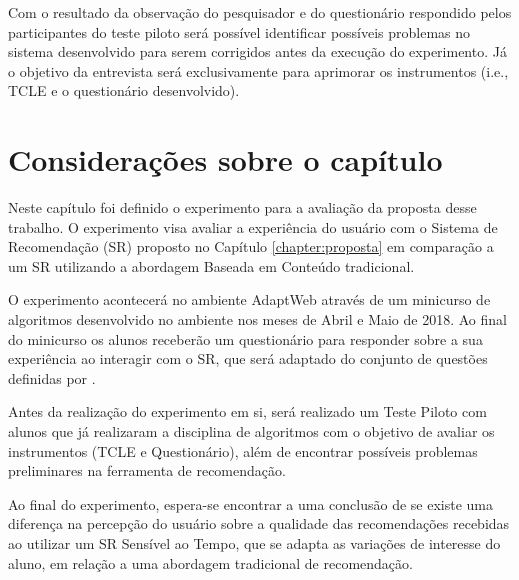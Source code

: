 Com o resultado da observação do pesquisador e do questionário respondido pelos participantes do teste piloto será possível
identificar possíveis problemas no sistema desenvolvido para serem corrigidos antes da execução do experimento. Já o objetivo da
entrevista será exclusivamente para aprimorar os instrumentos (i.e., TCLE e o questionário desenvolvido).

\section{Considerações sobre o capítulo}

Neste capítulo foi definido o experimento para a avaliação da proposta desse trabalho. O experimento visa avaliar a experiência
do usuário com o Sistema de Recomendação (SR) proposto no Capítulo \ref{chapter:proposta} em comparação a um SR utilizando
a abordagem Baseada em Conteúdo tradicional.

O experimento acontecerá no ambiente AdaptWeb\textsuperscript{\textregistered} através de um minicurso de algoritmos
desenvolvido no ambiente nos meses de Abril e Maio de 2018. Ao final do minicurso os alunos receberão um questionário
para responder sobre a sua experiência ao interagir com o SR, que será adaptado do conjunto de questões definidas por .

Antes da realização do experimento em si, será realizado um Teste Piloto com alunos que já realizaram a disciplina de algoritmos
com o objetivo de avaliar os instrumentos (TCLE e Questionário), além de encontrar possíveis problemas preliminares na
ferramenta de recomendação.

Ao final do experimento, espera-se encontrar a uma conclusão de se existe uma diferença na percepção do usuário sobre a
qualidade das recomendações recebidas ao utilizar um SR Sensível ao Tempo, que se adapta as variações de interesse do
aluno, em relação a uma abordagem tradicional de recomendação.
